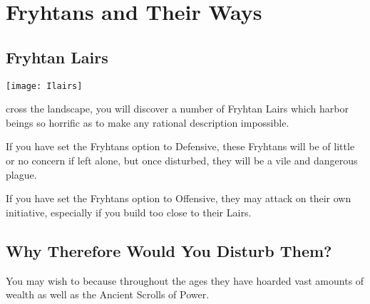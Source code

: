 
\chapter{Fryhtans and Their Ways}

\section{Fryhtan Lairs}


\begin{center}
    \texttt{[image: Ilairs]} %
\end{center}

cross the landscape, you will discover a number of Fryhtan Lairs which harbor beings so horrific as to make any rational description impossible.

If you have set the Fryhtans option to Defensive, these Fryhtans will be of little or no concern if left alone, but once disturbed, they will be a vile and dangerous plague.

If you have set the Fryhtans option to Offensive, they may attack on their own initiative, especially if you build too close to their Lairs.

\section{Why Therefore Would You Disturb Them?}


You may wish to because throughout the ages they have hoarded vast amounts of wealth as well as the Ancient Scrolls of Power.

